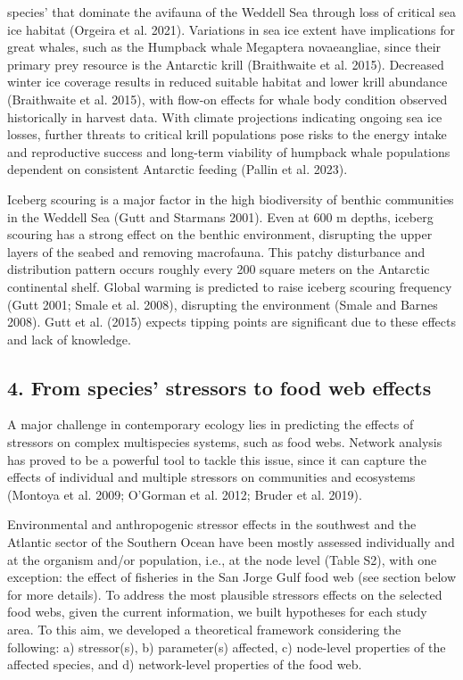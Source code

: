 \documentclass[
]{article}
\begin{document}
species' that dominate the avifauna of the Weddell Sea through loss of
critical sea ice habitat (Orgeira et al. 2021). Variations in sea ice
extent have implications for great whales, such as the Humpback whale
Megaptera novaeangliae, since their primary prey resource is the
Antarctic krill (Braithwaite et al. 2015). Decreased winter ice coverage
results in reduced suitable habitat and lower krill abundance
(Braithwaite et al. 2015), with flow-on effects for whale body condition
observed historically in harvest data. With climate projections
indicating ongoing sea ice losses, further threats to critical krill
populations pose risks to the energy intake and reproductive success and
long-term viability of humpback whale populations dependent on
consistent Antarctic feeding (Pallin et al. 2023).

Iceberg scouring is a major factor in the high biodiversity of benthic
communities in the Weddell Sea (Gutt and Starmans 2001). Even at 600 m
depths, iceberg scouring has a strong effect on the benthic environment,
disrupting the upper layers of the seabed and removing macrofauna. This
patchy disturbance and distribution pattern occurs roughly every 200
square meters on the Antarctic continental shelf. Global warming is
predicted to raise iceberg scouring frequency (Gutt 2001; Smale et al.
2008), disrupting the environment (Smale and Barnes 2008). Gutt et al.
(2015) expects tipping points are significant due to these effects and
lack of knowledge.

\subsection{4. From species' stressors to food web
effects}\label{from-species-stressors-to-food-web-effects}

A major challenge in contemporary ecology lies in predicting the effects
of stressors on complex multispecies systems, such as food webs. Network
analysis has proved to be a powerful tool to tackle this issue, since it
can capture the effects of individual and multiple stressors on
communities and ecosystems (Montoya et al. 2009; O'Gorman et al. 2012;
Bruder et al. 2019).

Environmental and anthropogenic stressor effects in the southwest and
the Atlantic sector of the Southern Ocean have been mostly assessed
individually and at the organism and/or population, i.e., at the node
level (Table S2), with one exception: the effect of fisheries in the San
Jorge Gulf food web (see section below for more details). To address the
most plausible stressors effects on the selected food webs, given the
current information, we built hypotheses for each study area. To this
aim, we developed a theoretical framework considering the following: a)
stressor(s), b) parameter(s) affected, c) node-level properties of the
affected species, and d) network-level properties of the food web.
\end{document}
